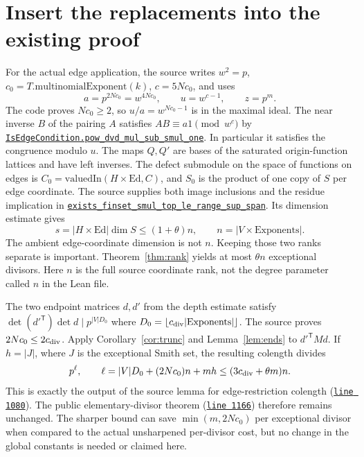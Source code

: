 \documentclass[11pt]{article}
\newcommand{\anchor}[3]{\href{https://github.com/VladimirReshetnikov/ProveIt/blob/17bf37ab3b6740d5d7430065d2f2a1a2a03e8a0e/Analysis/GeneralizedRiemannHypothesis/Lean/grh/src/#1.lean\#L#2}{\texttt{#3}}}
\begin{document}
\section{Insert the replacements into the existing proof}
For the actual edge application, the source writes $w^2=p$, $c_0=T.\mathrm{multinomialExponent}(k)$, $c=5Nc_0$, and uses
\[
 a=p^{2Nc_0}=w^{4Nc_0},\qquad u=w^{c-1},\qquad z=p^m.
\]
The code proves $Nc_0\ge2$, so $u/a=w^{Nc_0-1}$ is in the maximal ideal. The near inverse $B$ of the pairing $A$ satisfies $AB\equiv a1\pmod{w^c}$ by \anchor{New/UpperBound/ElementaryDivisors/ElementaryDivisorTheorem}{958}{IsEdgeCondition.pow\_dvd\_mul\_sub\_smul\_one}. In particular it satisfies the congruence modulo $u$. The maps $Q,Q'$ are bases of the saturated origin-function lattices and have left inverses. The defect submodule on the space of functions on edges is $C_0=\mathrm{valuedIn}(H\times\mathrm{Ed},C)$, and $S_0$ is the product of one copy of $S$ per edge coordinate. The source supplies both image inclusions and the residue implication in \anchor{New/UpperBound/ElementaryDivisors/ElementaryDivisorTheorem}{1011}{exists\_finset\_smul\_top\_le\_range\_sup\_span}. Its dimension estimate gives
\[
 s=|H\times\mathrm{Ed}|\dim S\le (1+\theta)n,
 \qquad n=|V\times\mathrm{Exponents}|.
\]
The ambient edge-coordinate dimension is not $n$. Keeping those two ranks separate is important. Theorem~\ref{thm:rank} yields at most $\theta n$ exceptional divisors. Here $n$ is the full source coordinate rank, not the degree parameter called $n$ in the Lean file.

The two endpoint matrices $d,d'$ from the depth estimate satisfy $\det(d'^\mathsf T)\det d\mid p^{|V|D_0}$ where $D_0=\lfloor c_{\rm div}|\mathrm{Exponents}|\rfloor$. The source proves $2Nc_0\le2c_{\rm div}$. Apply Corollary~\ref{cor:trunc} and Lemma~\ref{lem:ends} to $d'^\mathsf T M d$. If $h=|J|$, where $J$ is the exceptional Smith set, the resulting colength divides
\[
 p^\ell,\qquad \ell=|V|D_0+(2Nc_0)n+mh
     \le (3c_{\rm div}+\theta m)n.
\]
This is exactly the output of the source lemma for edge-restriction colength (\anchor{New/UpperBound/ElementaryDivisors/ElementaryDivisorTheorem}{1080}{line 1080}). The public elementary-divisor theorem (\anchor{New/UpperBound/ElementaryDivisors/ElementaryDivisorTheorem}{1166}{line 1166}) therefore remains unchanged. The sharper bound can save $\min(m,2Nc_0)$ per exceptional divisor when compared to the actual unsharpened per-divisor cost, but no change in the global constants is needed or claimed here.
\end{document}
